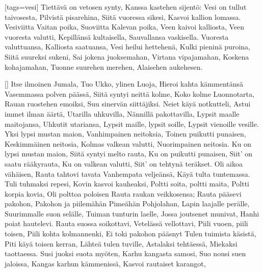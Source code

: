 [tags={vesi}]
  \beginverse
    Tiettävä on vetosen synty,
    Kanssa kastehen sijentö:
    Vesi on tullut taivosesta,
    Pilvistä pisarehina,
    Siitä vuoressa sikesi,
    Kasvoi kallion lomassa.
    Vesiviitta Vaitan poika,
    Suoviitta Kalevan poika,
    Veen kaivoi kalliosta,
    Veen vuoresta valutti,
    Kepillänsä kultaisella,
    Sauvallansa vaskisella.
  \endverse
  \beginverse
    Vuoresta valuttuansa,
    Kalliosta saatuansa,
    Vesi heilui hettehenä,
    Kulki pieninä puroina,
    Siitä suureksi sukeni,
    Sai jokena juoksemahan,
    Virtana vipajamahan,
    Koskena kohajamahan,
    Tuonne suurehen merehen,
    Alaisehen aukehesen.
  \endverse
\endsong


[]
  \beginverse
    Itse ilmoinen Jumala,
    Tuo Ukko, ylinen Luoja,
    Hieroi kahta kämmentänsä
    Vasemmassa polven päässä,
    Siitä syntyi neittä kolme,
    Koko kolme Luonnotarta,
    Rauan ruostehen emoiksi,
    Suu sinervän siittäjiksi.
  \endverse
  \beginverse
    Neiet käyä notkutteli,
    Astui immet ilman äärtä,
    Utarilla uhkuvilla,
    Nännillä pakottavilla,
    Lypsit maalle maitojansa,
    Uhkutit utariansa,
    Lypsit maille, lypsit soille,
    Lypsit vienoille vesille.
    Yksi lypsi mustan maion,
    Vanhimpainen neitoksia,
    Toinen puikutti punaisen,
    Keskimmäinen neitosia,
    Kolmas valkean valutti,
    Nuorimpainen neitosia.
    Ku on lypsi mustan maion,
    Siitä syntyi melto rauta,
    Ku on puikutti punaisen,
    Siit' on saatu rääkyrauta,
    Ku on valkean valutti,
    Siit' on tehtynä teräkset.
  \endverse
  \beginverse
    Oli aikoa vähäisen,
    Rauta tahtovi tavata
    Vanhempata veljeänsä,
    Käyä tulta tuntemassa.
    Tuli tuhmaksi repesi,
    Kovin kasvoi kauheaksi,
    Poltti soita, poltti maita,
    Poltti korpia kovia,
    Oli polttoa poloisen
    Rauta raukan veikkosensa;
    Rauta pääsevi pakohon,
    Pakohon ja piilemähän
    Pimeähän Pohjolahan,
    Lapin laajalle perälle,
    Suurimmalle suon selälle,
    Tuiman tunturin laelle,
    Jossa joutsenet munivat,
    Hanhi poiat hautelevi.
  \endverse
  \beginverse
    Rauta suossa soikottavi,
    Vetelässä vellottavi,
    Piili vuoen, piili toisen,
    Piili kohta kolmannenki,
    Ei toki pakohon pääsnyt
    Tulen tuimista käsistä,
    Piti käyä toisen kerran,
    Lähteä tulen tuville,
    Astalaksi tehtäessä,
    Miekaksi taottaessa.
  \endverse
  \beginverse
    Susi juoksi suota myöten,
    Karhu kangasta samosi,
    Suo nousi suen jaloissa,
    Kangas karhun kämmenissä,
    Kasvoi rautaiset karangot,
